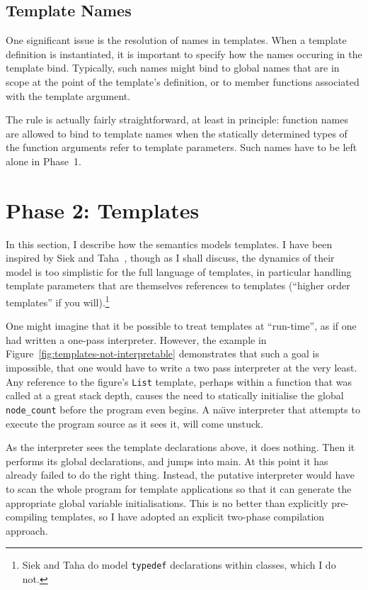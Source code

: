 \documentclass[11pt]{article}
\newcommand{\naive}{na\"\i{}ve}
\begin{document}
\subsection{Template Names}

One significant issue is the resolution of names in templates.  When a
template definition is instantiated, it is important to specify how
the names occuring in the template bind.  Typically, such names might
bind to global names that are in scope at the point of the template's
definition, or to member functions associated with the template
argument.

The rule is actually fairly straightforward, at least in principle:
function names are allowed to bind to template names when the
statically determined types of the function arguments refer to
template parameters.  Such names have to be left alone in Phase~1.



\section{Phase 2: Templates}

\label{sec:templates}

In this section, I describe how the semantics models templates.  I
have been inspired by Siek and Taha~\cite{DBLP:conf/ecoop/SiekT06},
though as I shall discuss, the dynamics of their model is too
simplistic for the full language of templates, in particular handling
template parameters that are themselves references to templates
(``higher order templates'' if you will).\footnote{Siek and Taha do
  model \texttt{typedef} declarations within classes, which I do not.}

One might imagine that it be possible to treat templates at
``run-time'', as if one had written a one-pass \cpp{} interpreter.
However, the example in Figure~\ref{fig:templates-not-interpretable}
demonstrates that such a goal is impossible, that one would have to
write a two pass interpreter at the very least.  Any reference to the
figure's \texttt{List} template, perhaps within a function that was
called at a great stack depth, causes the need to statically
initialise the global \texttt{node\_count} before the program even
begins.  A \naive{} interpreter that attempts to execute the program
source as it sees it, will come unstuck.

As the interpreter sees the template declarations above, it does
nothing.  Then it performs its global declarations, and jumps into
main.  At this point it has already failed to do the right thing.
Instead, the putative interpreter would have to scan the whole program
for template applications so that it can generate the appropriate
global variable initialisations.  This is no better than explicitly
pre-compiling templates, so I have adopted an explicit two-phase
compilation approach.
\end{document}
